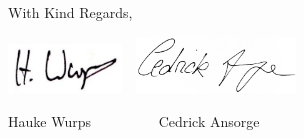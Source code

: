 \documentclass[brief]{fub}
\begin{document}
With Kind Regards, \vspace{-1em} 

\includegraphics[height=1.3cm]{signature_hauke.jpg}~~\includegraphics[height=1.5cm]{signature_transparent.png}\vspace{-2em}

Hauke Wurps \ \ \ \ \ \ \ \ \  Cedrick Ansorge

\end{document}
